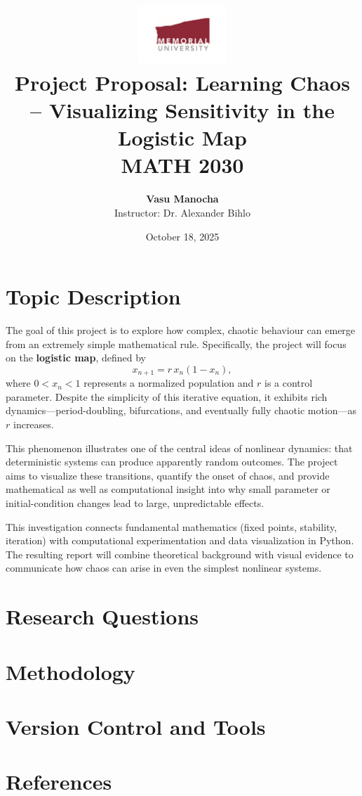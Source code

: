 \documentclass[12pt]{article}
\title{
    \includegraphics[width=0.25\textwidth]{mun_logo.pdf}\\[1em]
    \textbf{Project Proposal: Learning Chaos – Visualizing Sensitivity in the Logistic Map}\\
    \vspace{0.5em}
    \large MATH 2030 
}
\author{
    \textbf{Vasu Manocha} \\
    \vspace{0.3em}
    Instructor: Dr. Alexander Bihlo
}
\date{October 18, 2025}
\begin{document}
\maketitle
\thispagestyle{empty}
\clearpage

\setcounter{page}{1}


\section{Topic Description}
The goal of this project is to explore how complex, chaotic behaviour can emerge from an extremely simple mathematical rule. Specifically, the project will focus on the \textbf{logistic map}, defined by
\[
x_{n+1} = r\,x_n(1 - x_n),
\]
where \(0 < x_n < 1\) represents a normalized population and \(r\) is a control parameter. Despite the simplicity of this iterative equation, it exhibits rich dynamics—period-doubling, bifurcations, and eventually fully chaotic motion—as \(r\) increases.

This phenomenon illustrates one of the central ideas of nonlinear dynamics: that deterministic systems can produce apparently random outcomes. The project aims to visualize these transitions, quantify the onset of chaos, and provide mathematical as well as computational insight into why small parameter or initial-condition changes lead to large, unpredictable effects.

This investigation connects fundamental mathematics (fixed points, stability, iteration) with computational experimentation and data visualization in Python. The resulting report will combine theoretical background with visual evidence to communicate how chaos can arise in even the simplest nonlinear systems.


\section{Research Questions}

\section{Methodology}

\section{Version Control and Tools}

\section{References}
\end{document}
